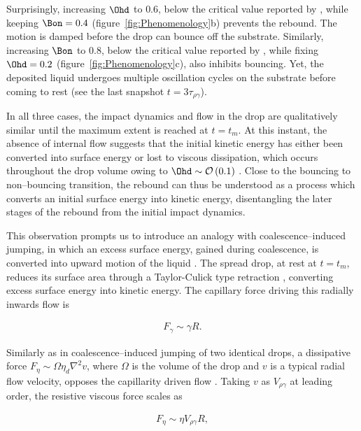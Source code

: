Surprisingly, increasing $\Ohd$ to $0.6$, below the critical value reported by \citet{jha2020viscous}, while keeping $\Bon = 0.4$ (figure~\ref{fig:Phenomenology}b) prevents the rebound. The motion is damped before the drop can bounce off the substrate.
Similarly, increasing $\Bon$ to 0.8, below the critical value reported by \citet{biance2006}, while fixing $\Ohd = 0.2$ (figure~\ref{fig:Phenomenology}c), also inhibits bouncing.  Yet, the deposited liquid undergoes multiple oscillation cycles on the substrate before coming to rest (see the last snapshot $t = 3\tau_{\rho\gamma}$).

In all three cases, the impact dynamics and flow in the drop are qualitatively similar until the maximum extent is reached at $t=t_m$. 
At this instant, the absence of internal flow suggests that the initial kinetic energy has either been converted into surface energy or lost to viscous dissipation, which occurs throughout the drop volume owing to $\Ohd \sim \mathcal{O}\left(0.1\right)$ \citep{eggers2010drop}.
Close to the bouncing to non--bouncing transition, the rebound can thus be understood as a process which converts an initial surface energy into kinetic energy, disentangling the later stages of the rebound from the initial impact dynamics.

This observation prompts us to introduce an analogy with coalescence--induced jumping, in which an excess surface energy, gained during coalescence, is converted into upward motion of the liquid \citep{boreyko2009}. The spread drop, at rest at $t = t_m$, reduces its surface area through a Taylor-Culick type retraction \citep{bartolo2005retraction}, converting excess surface energy into kinetic energy. The capillary force driving this radially inwards flow is

\begin{align}
	\label{eq:drivingCapillary}
	F_\gamma \sim \gamma R.
\end{align}

\noindent Similarly as in coalescence--induced jumping of two identical drops, a dissipative force $F_\eta \sim \Omega\eta_d\nabla^2v$, where $\Omega$ is the volume of the drop and $v$ is a typical radial flow velocity, opposes the capillarity driven flow \citep{mouterde2017merging, lecointre2019ballistics}. Taking $v$ as $V_{\rho\gamma}$ at leading order, the resistive viscous force scales as

\begin{align}
	\label{eq:resistVisc}
	F_\eta \sim \eta V_{\rho\gamma} R,
\end{align}


